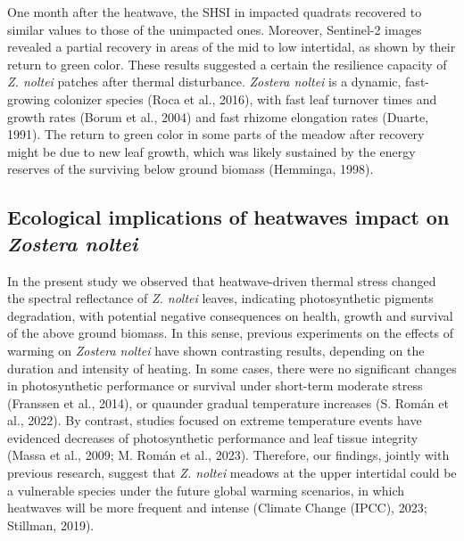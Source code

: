 \documentclass[
  letterpaper,
  11pt,
  english,
  singlespacing,
  headsepline]{MastersDoctoralThesis}
\begin{document}
\begin{spacing}{1.5}
One month after the heatwave, the SHSI in impacted quadrats recovered to
similar values to those of the unimpacted ones. Moreover, Sentinel-2
images revealed a partial recovery in areas of the mid to low
intertidal, as shown by their return to green color. These results
suggested a certain the resilience capacity of \emph{Z. noltei} patches
after thermal disturbance. \emph{Zostera noltei} is a dynamic,
fast-growing colonizer species (Roca et al., 2016), with fast leaf
turnover times and growth rates (Borum et al., 2004) and fast rhizome
elongation rates (Duarte, 1991). The return to green color in some parts
of the meadow after recovery might be due to new leaf growth, which was
likely sustained by the energy reserves of the surviving below ground
biomass (Hemminga, 1998).

\subsection{\texorpdfstring{Ecological implications of heatwaves impact
on \emph{Zostera
noltei}}{Ecological implications of heatwaves impact on Zostera noltei}}\label{ecological-implications-of-heatwaves-impact-on-zostera-noltei}

In the present study we observed that heatwave-driven thermal stress
changed the spectral reflectance of \emph{Z. noltei} leaves, indicating
photosynthetic pigments degradation, with potential negative
consequences on health, growth and survival of the above ground biomass.
In this sense, previous experiments on the effects of warming on
\emph{Zostera noltei} have shown contrasting results, depending on the
duration and intensity of heating. In some cases, there were no
significant changes in photosynthetic performance or survival under
short-term moderate stress (Franssen et al., 2014), or quaunder gradual
temperature increases (S. Román et al., 2022). By contrast, studies
focused on extreme temperature events have evidenced decreases of
photosynthetic performance and leaf tissue integrity (Massa et al.,
2009; M. Román et al., 2023). Therefore, our findings, jointly with
previous research, suggest that \emph{Z. noltei} meadows at the upper
intertidal could be a vulnerable species under the future global warming
scenarios, in which heatwaves will be more frequent and intense (Climate
Change (IPCC), 2023; Stillman, 2019).


\end{spacing}
\end{document}
